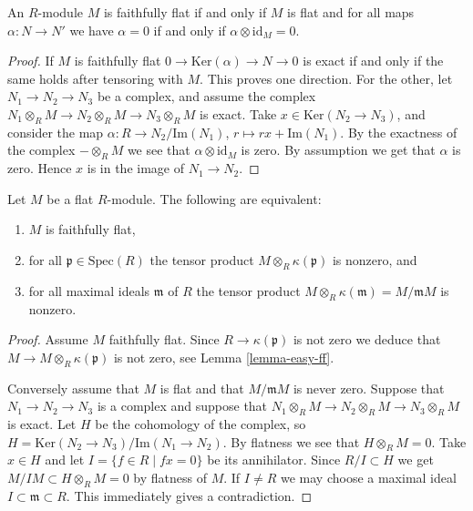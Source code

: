 \begin{lemma}
\label{lemma-easy-ff}
An $R$-module $M$ is faithfully flat if and only if $M$ is flat
and for all maps $\alpha : N \to N'$ we have 
$\alpha = 0$ if and only if $\alpha \otimes \text{id}_M = 0$.
\end{lemma}

\begin{proof}
If $M$ is faithfully flat $0 \to \text{Ker}(\alpha)
\to N \to 0$ is exact if and only if the same holds
after tensoring with $M$. This proves one direction.
For the other, let $N_1 \to N_2 \to N_3$
be a complex, and assume the complex
$N_1 \otimes_R M \to N_2 \otimes_R M \to N_3\otimes_R M$
is exact. Take $x \in \text{Ker}(N_2 \to N_3)$,
and consider the map $\alpha : R\to N_2/\text{Im}(N_1)$,
$r \mapsto rx + \text{Im}(N_1)$. By the exactness
of the complex $-\otimes_R M$ we see that $\alpha \otimes 
\text{id}_M$ is zero. By assumption we get that $\alpha$ is
zero. Hence $x $ is in the image of $N_1 \to N_2$.
\end{proof}

\begin{lemma}
\label{lemma-ff}
Let $M$ be a flat $R$-module.
The following are equivalent:
\begin{enumerate}
\item $M$ is faithfully flat,
\item for all $\mathfrak p \in \text{Spec}(R)$
the tensor product $M\otimes_R \kappa(\mathfrak p)$ is nonzero, and
\item for all maximal ideals $\mathfrak m$ of $R$
the tensor product $M\otimes_R \kappa(\mathfrak m) = M/{\mathfrak m}M$
is nonzero.
\end{enumerate}
\end{lemma}

\begin{proof}
Assume $M$ faithfully flat. Since $R \to \kappa({\mathfrak p})$ is not
zero we deduce that $M \to M \otimes_R \kappa({\mathfrak p})$ is not zero,
see Lemma \ref{lemma-easy-ff}.

\medskip\noindent
Conversely assume that $M$ is flat and that
$M/{\mathfrak m}M$ is never zero.
Suppose that $N_1 \to N_2 \to N_3$ is a complex and
suppose that $N_1 \otimes_R M \to N_2\otimes_R M \to
N_3\otimes_R M$ is exact. Let $H$ be the cohomology of the complex,
so $H = \text{Ker}(N_2 \to N_3)/\text{Im}(N_1 \to N_2)$.
By flatness we see that $H \otimes_R M = 0$. 
Take $x \in H$ and let $I = \{f \in R \mid fx = 0 \}$
be its annihilator. Since $R/I \subset H$ we get
$M/IM \subset H\otimes_R M = 0$ by flatness of $M$.
If $I \not=  R$ we may choose
a maximal ideal $I \subset \mathfrak m \subset R$.
This immediately gives a contradiction.
\end{proof}

